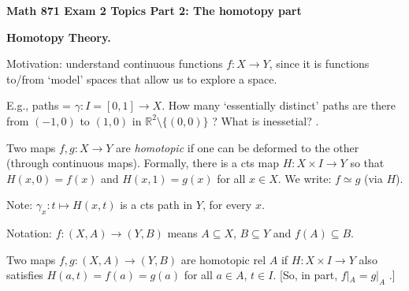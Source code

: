 \documentclass[12pt]{article}
\begin{document}
\def\ctln{\centerline}
\def\msk{\medskip}
\def\bsk{\bigskip}
\def\ssk{\smallskip}
\def\ra{\rightarrow}
\def\ubr{\underbar}
\def\sset{\subseteq}
\def\hsk{\hskip10pt}

\def\mt{{\mathcal T}}
\def\mb{{\mathcal B}}
\def\mbp{{\mathcal B}^\prime}
\def\mbpp{{\mathcal B}^{\prime\prime}}
\def\ms{{\mathcal S}}
\def\mu{{\mathcal U}}
\def\mv{{\mathcal V}}
\def\mp{{\mathcal P}}
\def\mtp{{\mathcal T}^\prime}
\def\mtpp{{\mathcal T}^{\prime\prime}}

\def\bbr{{\mathbb R}}
\def\bbz{{\mathbb Z}}
\def\bbq{{\mathbb Q}}
\def\spc{$~$\hskip.15in$~$}
\def\bbd{{\mathbb D}}
\def\bbc{{\mathbb C}}

\def\up{U^\prime}
\def\upp{U^{\prime\prime}}
\def\vp{V^\prime}
\def\vpp{V^{\prime\prime}}
\def\wp{W^\prime}
\def\wpp{W^{\prime\prime}}

\def\finv{f^{-1}}
\def\ginv{g^{-1}}
\def\hinv{h^{-1}}

\def\sset{\subseteq}
\def\lra{$\Leftrightarrow$}
\def\smin{\setminus}
\def\rta{$\Rightarrow$}
\def\rtta{\Rightarrow}


\ctln{\bf Math 871 Exam 2 Topics Part 2: The homotopy part}

\msk

{\bf Homotopy Theory.}

\ssk

Motivation: understand \ubr{all} continuous functions $f:X\ra Y$,
since it is functions to/from `model' spaces that allow us to 
explore a space. 

\ssk

E.g., paths = $\gamma:I=[0,1]\ra X$. How many `essentially distinct'
paths are there from $(-1,0)$ to $(1,0)$ in $\bbr^2\smin\{(0,0)\}$ ?
What is inessetial? \ubr{Deformations}.

\ssk

Two maps $f,g:X\ra Y$ are {\it homotopic} if one can be deformed 
to the other (through continuous maps). Formally, there is a
cts map $H:X\times I\ra Y$ so that $H(x,0)=f(x)$ and $H(x,1)=g(x)$
for all $x\in X$. We write: $f\simeq g$ (via $H$).

\ssk

Note: $\gamma_x:t\mapsto H(x,t)$ is a cts path in $Y$, for every $x$.

\ssk

Notation: $f:(X,A)\ra (Y,B)$ means $A\sset X$, $B\sset Y$ and $f(A)\sset B$.

\ssk

Two maps $f,g:(X,A)\ra (Y,B)$ are homotopic rel $A$ if 
$H:X\times I\ra Y$ also satisfies $H(a,t)=f(a)=g(a)$ for all $a\in A$, $t\in I$.
[So, in part, $f|_A=g|_A$ .]
\end{document}

